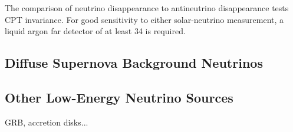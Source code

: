 %

The comparison
of neutrino disappearance to antineutrino disappearance tests CPT
invariance. For good sensitivity to either solar-neutrino measurement,
a liquid argon far detector of at least \SI{34}{\kt} is required.


\subsection{Diffuse Supernova Background Neutrinos}

\subsection{Other Low-Energy Neutrino Sources}


GRB, accretion disks...
